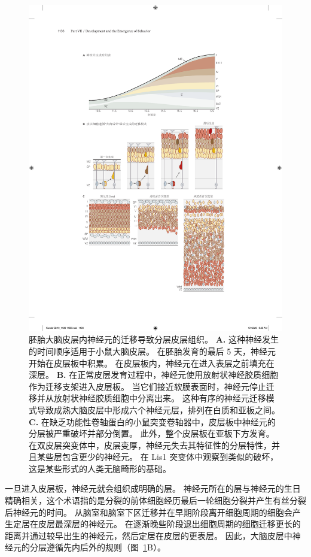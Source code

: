 \begin{figure}[htbp]
	\centering
	\includegraphics[width=0.9\linewidth]{chap46/fig_46_5}
	\caption{胚胎大脑皮层内神经元的迁移导致分层皮层组织\cite{olson2002smooth}。
		\textbf{A.} 这种神经发生的时间顺序适用于小鼠大脑皮层。
		在胚胎发育的最后 5 天，神经元开始在皮层板中积累。
		在皮层板内，神经元在进入表层之前填充在深层。 
		\textbf{B.} 在正常皮层发育过程中，神经元使用放射状神经胶质细胞作为迁移支架进入皮层板。
		当它们接近软膜表面时，神经元停止迁移并从放射状神经胶质细胞中分离出来。
		这种有序的神经元迁移模式导致成熟大脑皮层中形成六个神经元层，排列在白质和亚板之间。
		\textbf{C.} 在缺乏功能性卷轴蛋白的小鼠突变卷轴器中，皮层板中神经元的分层被严重破坏并部分倒置。
		此外，整个皮层板在亚板下方发育。
		在双皮层突变体中，皮层变厚，神经元失去其特征性的分层特性，并且某些层包含更少的神经元。
		在 Lis1 突变体中观察到类似的破坏，这是某些形式的人类无脑畸形的基础。}
	\label{fig:46_5}
\end{figure}


一旦进入皮层板，神经元就会组织成明确的层。
神经元所在的层与神经元的生日精确相关，这个术语指的是分裂的前体细胞经历最后一轮细胞分裂并产生有丝分裂后神经元的时间。
从脑室和脑室下区迁移并在早期阶段离开细胞周期的细胞会产生定居在皮层最深层的神经元。
在逐渐晚些阶段退出细胞周期的细胞迁移更长的距离并通过较早出生的神经元，然后定居在皮层的更表层。
因此，大脑皮层中神经元的分层遵循先内后外的规则（图~\ref{fig:46_5}B）。




